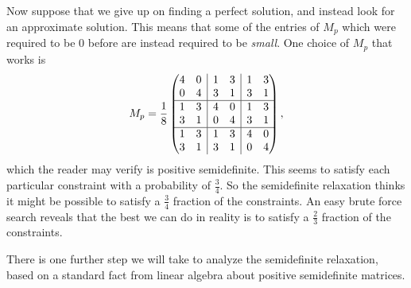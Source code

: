 \documentclass[letterpaper,11pt]{article}
\begin{document}
\begin{ex}
Now suppose that we give up on finding a perfect solution, and instead look for an approximate solution. This means that some of the entries of $M_p$ which were required to be $0$ before are instead required to be \emph{small}. One choice of $M_p$ that works is
\[
M_p = \frac{1}{8}\begin{pmatrix}\begin{matrix} 4 & 0\\ 0 & 4\end{matrix} & \rvline & \begin{matrix} 1 & 3\\ 3 & 1\end{matrix} & \rvline & \begin{matrix} 1 & 3\\ 3 & 1\end{matrix}\\
\hline \begin{matrix} 1 & 3\\ 3 & 1\end{matrix} & \rvline & \begin{matrix} 4 & 0\\ 0 & 4\end{matrix} & \rvline & \begin{matrix} 1 & 3\\ 3 & 1\end{matrix}\\
\hline \begin{matrix} 1 & 3\\ 3 & 1\end{matrix} & \rvline & \begin{matrix} 1 & 3\\ 3 & 1\end{matrix} & \rvline & \begin{matrix} 4 & 0\\ 0 & 4\end{matrix}\end{pmatrix},
\]
which the reader may verify is positive semidefinite. This seems to satisfy each particular constraint with a probability of $\frac{3}{4}$. So the semidefinite relaxation thinks it might be possible to satisfy a $\frac{3}{4}$ fraction of the constraints. An easy brute force search reveals that the best we can do in reality is to satisfy a $\frac{2}{3}$ fraction of the constraints.
\end{ex}

There is one further step we will take to analyze the semidefinite relaxation, based on a standard fact from linear algebra about positive semidefinite matrices.
\end{document}
